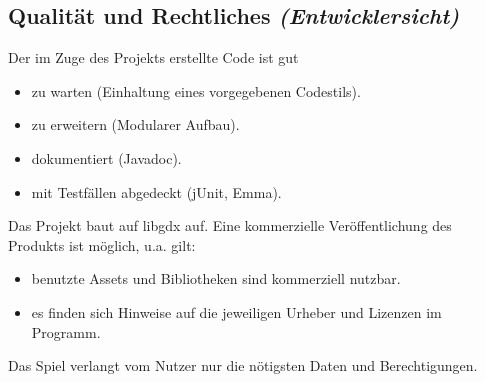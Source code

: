 \subsection{Qualität und Rechtliches \textit{(Entwicklersicht)}}
\begin{requirements}
	 Der im Zuge des Projekts erstellte Code ist gut
		\begin{itemize}
			\item zu warten (Einhaltung eines vorgegebenen Codestils).
			\item zu erweitern (Modularer Aufbau).
			\item dokumentiert (Javadoc).
			\item mit Testfällen abgedeckt (jUnit, Emma).
		\end{itemize}
	 Das Projekt baut auf libgdx auf.
	 Eine kommerzielle Veröffentlichung des Produkts ist möglich, u.a. gilt:
		\begin{itemize}
			\item benutzte Assets und Bibliotheken sind kommerziell nutzbar.
			\item es finden sich Hinweise auf die jeweiligen Urheber und Lizenzen im Programm.
		\end{itemize}
	 Das Spiel verlangt vom Nutzer nur die nötigsten Daten und Berechtigungen.
\end{requirements}
